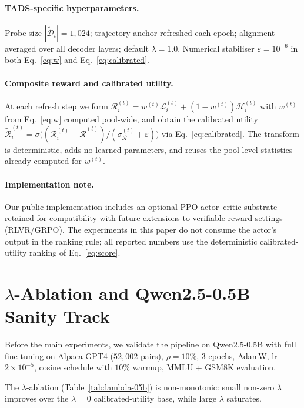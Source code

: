 \paragraph{\textsc{TADS}-specific hyperparameters.}
Probe size $|\widetilde{\mathcal{D}}_t|=1{,}024$; trajectory anchor
refreshed each epoch; alignment averaged over all decoder layers;
default $\lambda=1.0$. Numerical stabiliser $\varepsilon=10^{-6}$
in both Eq.~\ref{eq:w} and Eq.~\ref{eq:calibrated}.

\paragraph{Composite reward and calibrated utility.}
At each refresh step we form
$\mathcal{R}_i^{(t)} = w^{(t)}\mathcal{L}_i^{(t)} +
(1-w^{(t)})\mathcal{H}_i^{(t)}$
with $w^{(t)}$ from Eq.~\ref{eq:w} computed pool-wide, and obtain
the calibrated utility
$\tilde{\mathcal{R}}_i^{(t)} = \sigma\bigl((\mathcal{R}_i^{(t)} -
\bar{\mathcal{R}}^{(t)})/(\sigma_{\mathcal{R}}^{(t)} +
\varepsilon)\bigr)$
via Eq.~\ref{eq:calibrated}. The transform is deterministic, adds
no learned parameters, and reuses the pool-level statistics already
computed for $w^{(t)}$.

\paragraph{Implementation note.}
Our public implementation includes an optional PPO actor--critic
substrate retained for compatibility with future extensions to
verifiable-reward settings (RLVR/GRPO). The experiments in this
paper do not consume the actor's output in the ranking rule; all
reported numbers use the deterministic calibrated-utility ranking
of Eq.~\ref{eq:score}.

\section{$\lambda$-Ablation and Qwen2.5-0.5B Sanity Track}
\label{app:setup-validation}

Before the main experiments, we validate the pipeline on
Qwen2.5-0.5B with full fine-tuning on Alpaca-GPT4 ($52{,}002$ pairs),
$\rho=10\%$, 3 epochs, AdamW, lr $2\times10^{-5}$, cosine schedule
with $10\%$ warmup, MMLU + GSM8K evaluation.

The $\lambda$-ablation (Table~\ref{tab:lambda-05b}) is
non-monotonic: small non-zero $\lambda$ improves over the
$\lambda=0$ calibrated-utility base, while large $\lambda$
saturates.

